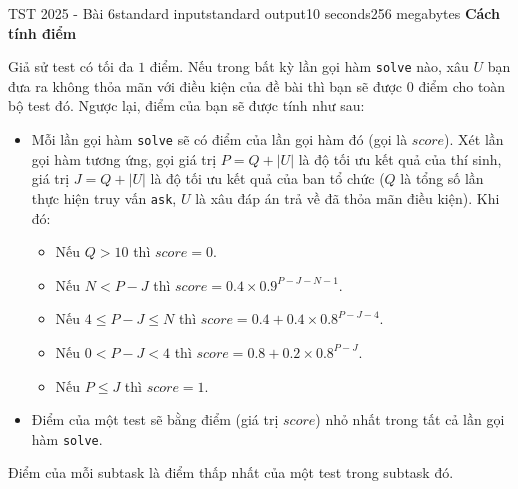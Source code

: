 \begin{problem}{TST 2025 - Bài 6}{standard input}{standard output}{10 seconds}{256 megabytes}
\textbf{Cách tính điểm}

Giả sử test có tối đa $1$ điểm. Nếu trong bất kỳ lần gọi hàm \texttt{solve} nào, xâu $U$ bạn đưa ra không thỏa mãn với điều kiện của đề bài thì bạn sẽ được $0$ điểm cho toàn bộ test đó. Ngược lại, điểm của bạn sẽ được tính như sau:
\begin{itemize}
   \item Mỗi lần gọi hàm \texttt{solve} sẽ có điểm của lần gọi hàm đó (gọi là $score$). Xét lần gọi hàm tương ứng, gọi giá trị $P=Q+|U|$ là độ tối ưu kết quả của thí sinh, giá trị $J=Q+|U|$ là độ tối ưu kết quả của ban tổ chức ($Q$ là tổng số lần thực hiện truy vấn \texttt{ask}, $U$ là xâu đáp án trả về đã thỏa mãn điều kiện). Khi đó:
   \begin{itemize}
      \item Nếu $Q>10$ thì $score=0$.
      \item Nếu $N<P-J$ thì $score=0.4\times 0.9^{P-J-N-1}$.
      \item Nếu $4\le P-J\le N$ thì $score=0.4+0.4\times 0.8^{P-J-4}$.
      \item Nếu $0<P-J<4$ thì $score=0.8+0.2\times 0.8^{P-J}$.
      \item Nếu $P\le J$ thì $score=1$.
   \end{itemize}
   \item Điểm của một test sẽ bằng điểm (giá trị $score$) nhỏ nhất trong tất cả lần gọi hàm \texttt{solve}.
\end{itemize}

Điểm của mỗi subtask là điểm thấp nhất của một test trong subtask đó.


\end{problem}

